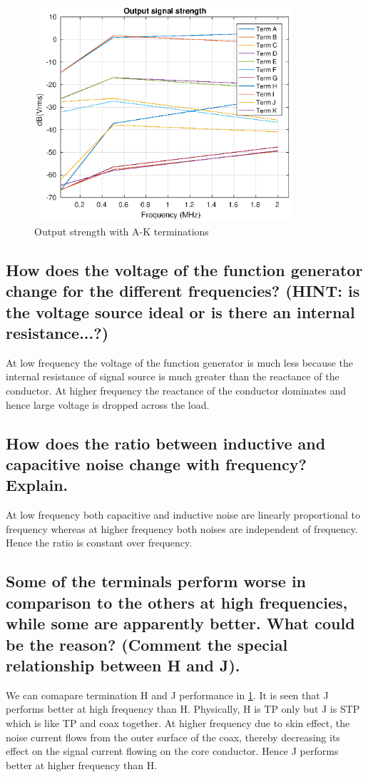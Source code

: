 \documentclass[12pt,a4paper,UKenglish]{article}
\begin{document}
\begin{figure} [H] %
  \centering 
  \includegraphics[width=0.85\textwidth]{img/output.eps} 
  \caption{Output strength with A-K terminations}
  \label{fig:task8out} 
\end{figure}

\subsection{How does the voltage of the function generator change for the different frequencies? (HINT: is the voltage source ideal or is there an internal resistance...?)} 
At low frequency the voltage of the function generator is much less because the internal resistance of signal source is much greater than the reactance of the conductor. At higher frequency the reactance of the conductor dominates and hence large voltage is dropped across the load.

\subsection{How does the ratio between inductive and capacitive noise change with frequency? Explain.}
At low frequency both capacitive and inductive noise are linearly proportional to frequency whereas at higher frequency both noises are independent of frequency. Hence the ratio is constant over frequency.

\subsection{Some of the terminals perform worse in comparison to the others at high frequencies, while some are apparently better. What could be the reason? (Comment the special relationship between H and J).}
We can comapare termination H and J performance in \ref{fig:task8out}. It is seen that J performs better at high frequency than H. Physically, H is TP only but J is STP which is like TP and coax together. At higher frequency due to skin effect, the noise current flows from the outer surface of the coax, thereby decreasing its effect on the signal current flowing on the core conductor. Hence J performs better at higher frequency than H.
\end{document}

